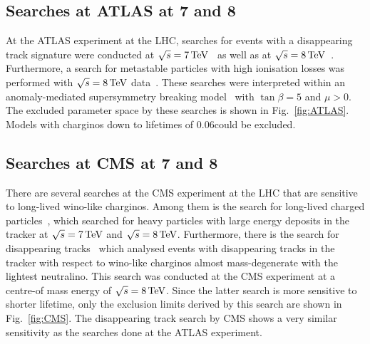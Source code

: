 \subsection*{Searches at ATLAS at 7 and 8\tev}
At the ATLAS experiment at the LHC, searches for events with a disappearing track signature were conducted at $\sqrt{s}=7\,\text{Te}\kern-0.06667em\text{V}$~\cite{bib:PreviousSearches_Atlas_DT_7TeV} as well as at $\sqrt{s}=8\,\text{Te}\kern-0.06667em\text{V}$~\cite{bib:PreviousSearches_Atlas_DT_8TeV}. 
Furthermore, a search for metastable particles with high ionisation losses was performed with $\sqrt{s}=8\,\text{Te}\kern-0.06667em\text{V}$ data~\cite{bib:PreviousSearches_ATLAS_DEDX}.
These searches were interpreted within an anomaly-mediated supersymmetry breaking model~\cite{bib:Theory_AMSB_1998} with $\tan\beta=5$ and $\mu>0$.
The excluded parameter space by these searches is shown in Fig.~\ref{fig:ATLAS}.
Models with charginos down to lifetimes of 0.06\ns could be excluded.


\subsection*{Searches at CMS at 7 and 8\tev}
There are several searches at the CMS experiment at the LHC that are sensitive to long-lived wino-like charginos.
Among them is the search for long-lived charged particles~\cite{bib:CMS:HSCP_8TeV}, which searched for heavy particles with large energy deposits in the tracker at $\sqrt{s}=7\,\text{Te}\kern-0.06667em\text{V}$  and $\sqrt{s}=8\,\text{Te}\kern-0.06667em\text{V}$.
Furthermore, there is the search for disappearing tracks~\cite{bib:CMS:DT_8TeV} which analysed events with disappearing tracks in the tracker with respect to wino-like charginos almost mass-degenerate with the lightest neutralino.
This search was conducted at the CMS experiment at a centre-of mass energy of $\sqrt{s}=8\,\text{Te}\kern-0.06667em\text{V}$.
Since the latter search is more sensitive to shorter lifetime, only the exclusion limits derived by this search are shown in Fig.~\ref{fig:CMS}.
The disappearing track search by CMS shows a very similar sensitivity as the searches done at the ATLAS experiment.

